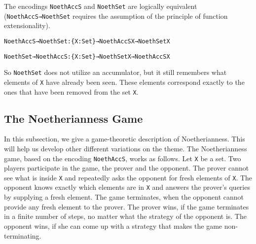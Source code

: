 \documentclass{eptcs}
\begin{document}
The encodings \verb+NoethAccS+ and \verb+NoethSet+ are logically
equivalent (\verb;NoethAccS→NoethSet; requires the
assumption of the principle of function extensionality).
\begin{alltt}
NoethAccS→NoethSet : \{X : Set\} → NoethAccS X → NoethSet X

NoethSet→NoethAccS : \{X : Set\} → NoethSet X → NoethAccS X
\end{alltt}
So \verb+NoethSet+ does not utilize an accumulator, but it still
remembers what elements of \verb+X+ have already been seen. These
elements correspond exactly to the ones that have been removed from
the set \verb+X+.

\subsection{The Noetherianness Game}
\label{the-noetherianness-game}

In this subsection, we give a game-theoretic description of Noetherianness. This
will help us develop other different variations on the theme. The Noetherianness
game, based on the encoding \verb;NoethAccS;, works as follows. Let \verb;X; be
a set. Two players participate in the game, the prover and the opponent. The
prover cannot see what is inside \verb;X; and repeatedly asks the opponent for
fresh elements of \verb;X;. The opponent knows exactly which elements are in
\verb;X; and answers the prover's queries by supplying a fresh element. The game
terminates, when the opponent cannot provide any fresh element to the prover. The
prover wins, if the game terminates in a finite number of steps, no matter what
the strategy of the opponent is. The opponent wins, if she can come up with a
strategy that makes the game non-terminating.
\end{document}
